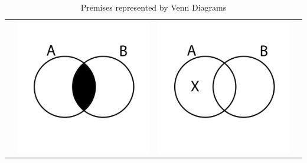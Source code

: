 \documentclass[12pt,a4paper]{report}
\begin{document}
\begin{table}[h!]
\begin{tabular}{  c  c  c  c }
\begin{minipage}{.22\textwidth}
    \end{minipage}
    & 
    \begin{minipage}{.22\textwidth}
      \includegraphics[width=\linewidth]{EVenn}
    \end{minipage}
    &
    \begin{minipage}{.22\textwidth}
      \includegraphics[width=\textwidth]{OVenn}
    \end{minipage}
    \\
  \end{tabular}
  \caption{Premises represented by Venn Diagrams}\label{tbl:vennPremises}
\end{table}
\end{document}
